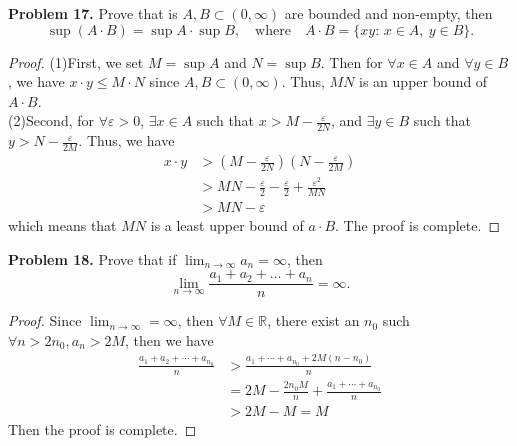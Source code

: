 \documentclass[12pt,leqno]{amsart}
\begin{document}
\noindent
{\bf Problem 17.}
Prove that is $A,B\subset (0,\infty)$ are bounded and non-empty, then
$$
\sup(A\cdot B)=\sup A \cdot\sup B,
\quad
\text{where}
\quad
A\cdot B=\{xy:\, x\in A,\ y\in B\}.
$$
\begin{proof}
(1)First, we set $M = \sup A$ and $N = \sup B$. Then for $\forall x \in A$ and  $\forall y \in B$, we have $x \cdot y \leq M \cdot N$ since $A, B \subset (0, \infty)$. Thus, $MN$ is an upper bound of $A \cdot B$.\\
\hspace*{2em}(2)Second, for $\forall \varepsilon > 0$, $\exists x \in A$ such that $x > M - \frac{\varepsilon}{2N}$, and $\exists y \in B$ such that $y > N - \frac{\varepsilon}{2M}$. Thus, we have
\begin{align*}
    x \cdot y & > \left( M - \frac{\varepsilon}{2N} \right) \left( N - \frac{\varepsilon}{2M} \right) \\
    & > MN  - \frac{\varepsilon}{2} - \frac{\varepsilon}{2} + \frac{\varepsilon^2}{MN} \\
    & > MN  - \varepsilon
\end{align*}
which means that $MN$ is a least upper bound of $a \cdot B$. The proof is complete.
\end{proof}


\noindent
{\bf Problem 18.}
Prove that if $\lim_{n\to\infty} a_n = \infty$, then
$$
\lim_{n\to\infty} \frac{a_1+a_2+\ldots+a_n}{n}=\infty.
$$
\begin{proof}
Since $\lim_{n\to\infty} = \infty$, then $\forall M \in \mathbb{R}$, there exist an $n_0$ such $\forall n > 2n_0, a_n > 2M$, then we have 
\begin{align*}
    \frac{a_1 + a_2 + \cdots + a_{n_0}}{n} & > \frac{a_1 + \cdots + a_n_0 + 2M(n - n_0)}{n} \\
    & = 2M - \frac{2n_0 M}{n} + \frac{a_1 + \cdots + a_{n_0}}{n}\\
    & > 2M - M = M
\end{align*}
Then the proof is complete.
\end{proof}
\end{document}
